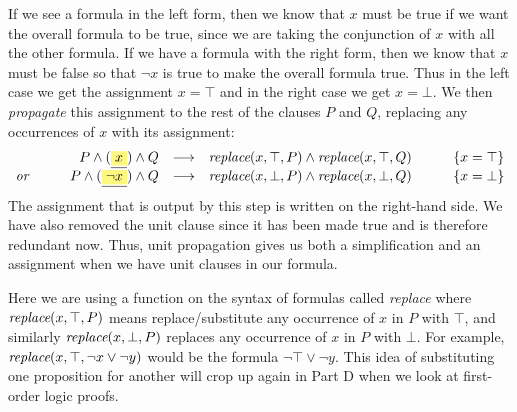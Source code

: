 If we see a formula in the left form, then we know that $x$ must be
true if we want the overall formula to be true, since we are taking
the conjunction of $x$ with all the other formula. If we have a
formula with the right form, then we know that $x$ must be false so
that $\neg x$ is true to make the overall formula true. Thus
in the left case we get the assignment $x = \top$ and in the right
case we get $x = \bot$. We then \emph{propagate} this assignment to
the rest of the clauses $P$ and $Q$, replacing any occurrences of $x$
with its assignment:
%
\begin{align*}
  \begin{array}{lrcll}
& P \wedge (\highlight{x}) \wedge Q
& \longrightarrow &
\subst{\top}{x}{P} \wedge \subst{\top}{x}{Q} & \qquad
\{x = \top\} \\
\textit{or} \qquad & P \wedge
(\highlight{\neg x}) \wedge Q
& \longrightarrow &
\subst{\bot}{x}{P} \wedge \subst{\bot}{x}{Q} & \qquad
\{x = \bot\}
\end{array}
\end{align*}
%
The assignment that is output by this step is written on the
right-hand side. We have also removed the unit clause since it has
been made true and is therefore redundant now. Thus, unit propagation
gives us both a simplification and an assignment when we have unit
clauses in our formula.

Here we are using a function on the syntax of formulas called
\emph{replace} where $\textit{replace}(x, \top, P)$ means replace/substitute any
occurrence of $x$ in $P$ with $\top$, and similarly $\textit{replace}(x, \bot, P)$
replaces any occurrence of $x$ in $P$ with $\bot$.
For example, $\textit{replace}(x, \top, \neg x \vee \neg y)$ would be
the formula $\neg \top \vee \neg y$.
This idea of
substituting one proposition for another will crop up again in Part D
when we look at first-order logic proofs.

